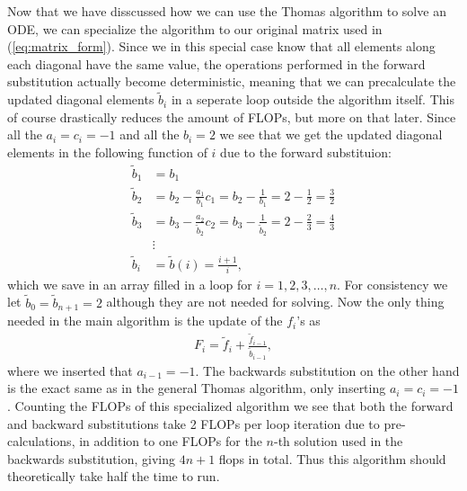 \documentclass[twocolumn]{aastex62}
\begin{document}
Now that we have disscussed how we can use the Thomas algorithm to solve an ODE, we can specialize the algorithm to our original matrix used in (\ref{eq:matrix_form}). Since we in this special case know that all elements along each diagonal have the same value, the operations performed in the forward substitution actually become deterministic, meaning that we can precalculate the updated diagonal elements $\tilde{b}_i$ in a seperate loop outside the algorithm itself. This of course drastically reduces the amount of FLOPs, but more on that later. Since all the $a_i = c_i = -1$ and all the $b_i = 2$ we see that we get the updated diagonal elements in the following function of $i$ due to the forward substituion:
\begin{align}
	\tilde{b}_1 &= b_1\\
	\tilde{b}_2 &= b_2 - \frac{a_1}{b_1}c_1 = b_2 - \frac{1}{b_1} = 2 - \frac{1}{2} = \frac{3}{2}\\
	\tilde{b}_3 &= b_3 - \frac{a_2}{\tilde{b}_2}c_2 = b_3 - \frac{1}{\tilde{b}_2} = 2 - \frac{2}{3} = \frac{4}{3}\\
	&\vdots\\
	\tilde{b}_i &= \tilde{b}(i) = \frac{i + 1}{i},
\end{align} 
which we save in an array filled in a loop for $i = 1, 2, 3,\ldots, n$. For consistency we let $\tilde{b}_0 = \tilde{b}_{n+1} = 2$ although they are not needed for solving. Now the only thing needed in the main algorithm is the update of the $f_i$'s as 
\begin{align}
	F_i = \tilde{f}_i + \frac{\tilde{f}_{i-1}}{\tilde{b}_{i-1}},
\end{align}
where we inserted that $a_{i-1} = -1$.
The backwards substitution on the other hand is the exact same as in the general Thomas algorithm, only inserting $a_i = c_i = -1$.
Counting the FLOPs of this specialized algorithm we see that both the forward and backward substitutions take 2 FLOPs per loop iteration due to pre-calculations, in addition to one FLOPs for the $n$-th solution used in the backwards substitution, giving $4n + 1$ flops in total. Thus this algorithm should theoretically take half the time to run.
\end{document}
